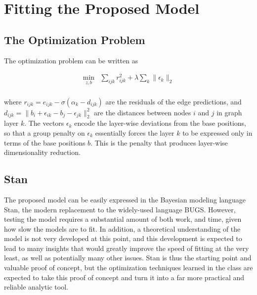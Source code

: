 \documentclass[11pt]{scrartcl}
\begin{document}


\section{Fitting the Proposed Model}
\subsection{The Optimization Problem}
The optimization problem can be written as

\begin{align*}
\min_{z,b} &\sum_{ijk} r_{ijk}^2 + \lambda \sum_k \|\epsilon_k\|_2\\
\end{align*}

where $r_{ijk} = e_{ijk} - \sigma(\alpha_k - d_{ijk})$ are the residuals of the edge predictions, and $d_{ijk} = \|b_i + \epsilon_{ik} - b_j - \epsilon_{jk}\|^2_2$ are the distances between nodes $i$ and $j$ in graph layer $k$. The vectors $\epsilon_k$ encode the layer-wise deviations from the base positions, so that a group penalty on $\epsilon_k$ essentially forces the layer $k$ to be expressed only in terms of the base positions $b$. This is the penalty that produces layer-wise dimensionality reduction.

\subsection{Stan}
The proposed model can be easily expressed in the Bayesian modeling language Stan, the modern replacement to the widely-used language BUGS. However, testing the model requires a substantial amount of both work, and time, given how slow the models are to fit. In addition, a theoretical understanding of the model is not very developed at this point, and this development is expected to lead to many insights that would greatly improve the speed of fitting at the very least, as well as potentially many other issues. Stan is thus the starting point and valuable proof of concept, but the optimization techniques learned in the class are expected to take this proof of concept and turn it into a far more practical and reliable analytic tool. 
\end{document}

